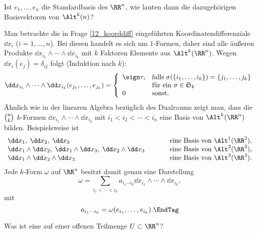\begin{frage}
  Ist $e_1,\ldots,e_n$ die Standardbasis des $\RR^n$, 
  wie lauten dann die dazugehörigen Basisvektoren von $\Alt^k(n)$?
\end{frage}

\begin{antwort}
  Man betrachte die in Frage \ref{12_koorddiff} eingeführten 
  Koordinatendifferenziale $\dd x_i$ ($i=1,\ldots,n$). 
  Bei diesen handelt es sich um $1$-Formen, daher sind alle äußeren 
  Produkte $\dd x_{i_1}\wedge \cdots \wedge \dd x_{i_k}$ 
  mit $k$ Faktoren Elemente aus $\Alt^k(\RR^n)$. 
  Wegen $\dd x_i(e_j)=\delta_{ij}$ folgt (Induktion nach $k$):
  \[    
  \dd x_{i_1}\wedge \cdots \wedge 
  \dd x_{i_k}(e_{j_1},\ldots,e_{j_k}) = 
  \left\{ \begin{array}{ll} \sign \tau, & \text{falls 
        $\sigma( \{i_1,\ldots,i_k \} )=\{ j_1,\ldots,j_k \}$} \\
      & \text{für ein $\sigma\in\mathfrak{S}_k$} \\
      0 & \text{sonst}. \end{array}\right.
  \]
  Ähnlich wie in der linearen Algebra bezüglich des 
  Dualraums zeigt man, dass die $\tbinom{n}{k}$ 
  $k$-Formen $\dd x_{i_1} \wedge \cdots \wedge \dd x_{i_k}$ mit 
  $i_1 < i_2 < \cdots < i_n$ eine Basis von $\Alt^k(\RR^n)$ bilden. 
  Beispielsweise ist 
  \[
  \begin{array}{lp{6mm}l}
    \dd x_1,\; \dd x_2, \; \dd x_3 & & \text{eine Basis von $\Alt^1(\RR^3)$,} \\
    \dd x_1 \wedge \dd x_2, \; \dd x_1 \wedge 
    \dd x_3, \; \dd x_2 \wedge \dd x_3 & & \text{eine Basis von $\Alt^2(\RR^3)$,} \\
    \dd x_1 \wedge \dd x_2 \wedge \dd x_3 & & 
    \text{eine Basis von $\Alt^3(\RR^3)$.} 
  \end{array}
  \] 
  Jede $k$-Form $\omega$ auf $\RR^n$ besitzt damit genau eine 
  Darstellung 
  \[
  \omega = \sum_{i_1 < \cdots < i_k } a_{i_1 \cdots i_k} 
  \dd x_{i_1} \wedge \cdots \wedge \dd x_{i_k},
  \]
  mit 
  \[
  a_{i_1 \cdots i_k} = \omega( e_{i_1}, \ldots, e_{i_k} ). \EndTag
  \]
\end{antwort} 

\begin{frage}
  Was ist eine 
  auf einer offenen Teilmenge $U\subset\RR^n$?
\end{frage}

